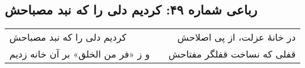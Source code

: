 \begin{center}
\section*{رباعی شماره ۴۹: کردیم دلی را که نبد مصباحش}
\label{sec:049}
\begin{longtable}{l p{0.5cm} r}
کردیم دلی را که نبد مصباحش
&&
در خانهٔ عزلت، از پی اصلاحش
\\
و ز «فر من الخلق» بر آن خانه زدیم
&&
قفلی که نساخت قفلگر مفتاحش
\\
\end{longtable}
\end{center}
